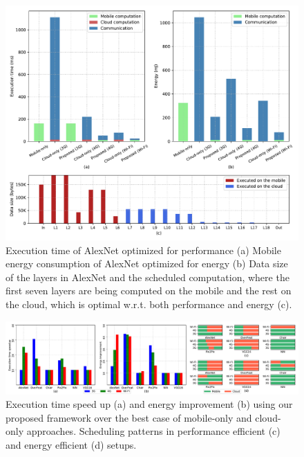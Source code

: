 \documentclass[conference,9pt]{IEEEtran}
\begin{document}
\begin{figure}[htbp]
\centerline{\includegraphics[width=\columnwidth]{alexnet_extracted.pdf}}
\caption{Execution time of AlexNet optimized for performance (a) Mobile energy consumption of AlexNet optimized for energy (b) Data size of the layers in AlexNet and the scheduled computation, where the first seven layers are being computed on the mobile and the rest on the cloud, which is optimal w.r.t. both performance and energy (c).}
\label{alexnet_extracted}
\end{figure}
\begin{figure}[htbp]
\centerline{\includegraphics[width=\textwidth]{benchmarks_perf_energy.pdf}}
\caption{Execution time speed up (a) and energy improvement (b) using our proposed framework over the best case of mobile-only and cloud-only approaches. Scheduling patterns in performance efficient (c) and energy efficient (d) setups.}
\label{benchmark_perf_energy}
\end{figure}
\end{document}

